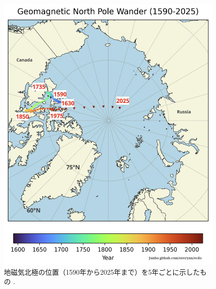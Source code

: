 \documentclass[10pt,twocolumn,letterpaper]{article}
\begin{document}
\begin{figure}[t]
\begin{center}
   \includegraphics[width=1\linewidth]{npw.jpg}
\end{center}
   \caption{地磁気北極の位置（1590年から2025年まで）を5年ごとに示したもの \cite{142}.}
\label{fig:13}
\label{fig:onecol}
\end{figure}
\end{document}
